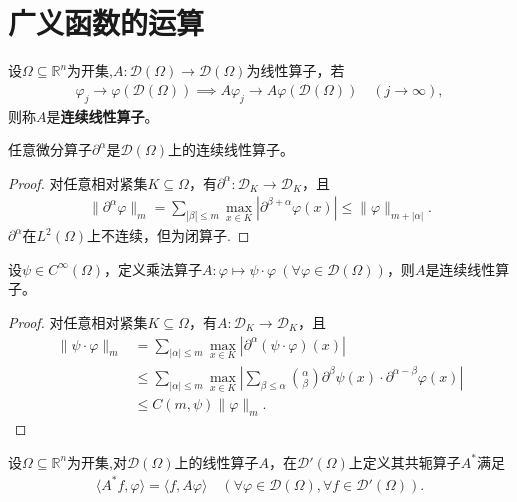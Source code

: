 \documentclass[../../main.tex]{subfiles}%
\begin{document}
\section{广义函数的运算}

\begin{definition}
设$\Omega\subseteq\mathbb{R}^n$为开集,$A:\mathscr{D}(\Omega)\to\mathscr{D}(\Omega)$为线性算子，若
\begin{align*}
\varphi_j\to\varphi(\mathscr{D}(\Omega))\implies A\varphi_j\to A\varphi(\mathscr{D}(\Omega))\quad(j\to\infty),
\end{align*}
则称$A$是\textbf{连续线性算子}。
\end{definition}

\begin{example}
任意微分算子$\partial^\alpha$是$\mathscr{D}(\Omega)$上的连续线性算子。
\end{example}
\begin{proof}
对任意相对紧集$K\subseteq\Omega$，有$\partial^\alpha:\mathscr{D}_K\to\mathscr{D}_K$，且
\begin{align*}
\|\partial^\alpha\varphi\|_m=\sum\limits_{|\beta|\leqslant m}\max\limits_{x\in K}|\partial^{\beta+\alpha}\varphi(x)|\leqslant\|\varphi\|_{m+|\alpha|}.
\end{align*}
$\partial^\alpha$在$L^2(\Omega)$上不连续，但为闭算子.
\end{proof}

\begin{example}
设$\psi\in C^\infty(\Omega)$，定义乘法算子$A:\varphi\mapsto\psi\cdot\varphi\ (\forall\varphi\in\mathscr{D}(\Omega))$，则$A$是连续线性算子。
\end{example}
\begin{proof}
对任意相对紧集$K\subseteq\Omega$，有$A:\mathscr{D}_K\to\mathscr{D}_K$，且
\begin{align*}
\|\psi\cdot\varphi\|_m&=\sum\limits_{|\alpha|\leqslant m}\max\limits_{x\in K}|\partial^\alpha(\psi\cdot\varphi)(x)|\\
&\leqslant\sum\limits_{|\alpha|\leqslant m}\max\limits_{x\in K}\left|\sum\limits_{\beta\leqslant\alpha}\binom{\alpha}{\beta}\partial^\beta\psi(x)\cdot\partial^{\alpha-\beta}\varphi(x)\right|\\
&\leqslant C(m,\psi)\|\varphi\|_m.
\end{align*}
\end{proof}

\begin{definition}
设$\Omega\subseteq\mathbb{R}^n$为开集,对$\mathscr{D}(\Omega)$上的线性算子$A$，在$\mathscr{D}'(\Omega)$上定义其共轭算子$A^*$满足
\begin{align*}
\langle A^*f,\varphi\rangle=\langle f,A\varphi\rangle\quad(\forall\varphi\in\mathscr{D}(\Omega),\forall f\in\mathscr{D}'(\Omega)).
\end{align*}
\end{definition}
\end{document}
